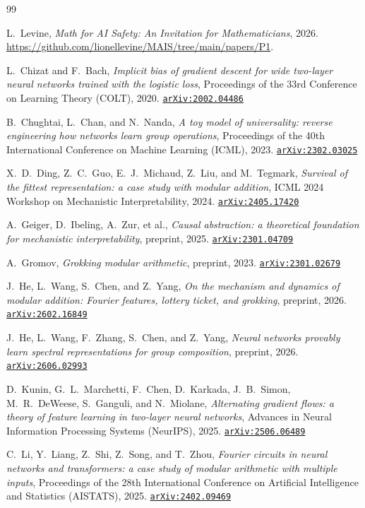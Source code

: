 \documentclass[11pt]{amsart}
\newcommand{\arxiv}[1]{\href{https://arxiv.org/abs/#1}{\texttt{arXiv:#1}}}
\theoremstyle{plain}
\theoremstyle{definition}
\begin{document}
\begin{thebibliography}{99}

L.~Levine,
\emph{Math for AI Safety: An Invitation for Mathematicians},
2026. \url{https://github.com/lionellevine/MAIS/tree/main/papers/P1}.


L.~Chizat and F.~Bach,
\emph{Implicit bias of gradient descent for wide two-layer neural networks trained with the logistic loss},
Proceedings of the 33rd Conference on Learning Theory (COLT), 2020.
\arxiv{2002.04486}

B.~Chughtai, L.~Chan, and N.~Nanda,
\emph{A toy model of universality: reverse engineering how networks learn group operations},
Proceedings of the 40th International Conference on Machine Learning (ICML), 2023.
\arxiv{2302.03025}

X.~D.~Ding, Z.~C.~Guo, E.~J.~Michaud, Z.~Liu, and M.~Tegmark,
\emph{Survival of the fittest representation: a case study with modular addition},
ICML 2024 Workshop on Mechanistic Interpretability, 2024.
\arxiv{2405.17420}

A.~Geiger, D.~Ibeling, A.~Zur, et al.,
\emph{Causal abstraction: a theoretical foundation for mechanistic interpretability},
preprint, 2025.
\arxiv{2301.04709}

A.~Gromov,
\emph{Grokking modular arithmetic},
preprint, 2023.
\arxiv{2301.02679}

J.~He, L.~Wang, S.~Chen, and Z.~Yang,
\emph{On the mechanism and dynamics of modular addition: Fourier features, lottery ticket, and grokking},
preprint, 2026.
\arxiv{2602.16849}

J.~He, L.~Wang, F.~Zhang, S.~Chen, and Z.~Yang,
\emph{Neural networks provably learn spectral representations for group composition},
preprint, 2026.
\arxiv{2606.02993}

D.~Kunin, G.~L.~Marchetti, F.~Chen, D.~Karkada, J.~B.~Simon, M.~R.~DeWeese, S.~Ganguli, and N.~Miolane,
\emph{Alternating gradient flows: a theory of feature learning in two-layer neural networks},
Advances in Neural Information Processing Systems (NeurIPS), 2025.
\arxiv{2506.06489}

C.~Li, Y.~Liang, Z.~Shi, Z.~Song, and T.~Zhou,
\emph{Fourier circuits in neural networks and transformers: a case study of modular arithmetic with multiple inputs},
Proceedings of the 28th International Conference on Artificial Intelligence and Statistics (AISTATS), 2025.
\arxiv{2402.09469}


\end{thebibliography}
\end{document}
